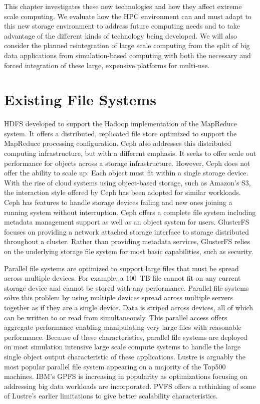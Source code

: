This chapter investigates these new technologies and how they affect extreme
scale computing. We evaluate how the HPC environment can and must adapt to this
new storage environment to address future computing needs and to take advantage
of the different kinds of technology being developed. We will also consider the
planned reintegration of large scale computing from the split of big data
applications from simulation-based computing with both the necessary and forced
integration of these large, expensive platforms for multi-use.

\section{Existing File Systems}

HDFS developed to support the Hadoop implementation of the MapReduce system. It
offers a distributed, replicated file store optimized to support the MapReduce
processing configuration. Ceph also addresses this distributed computing
infrastructure, but with a different emphasis. It seeks to offer scale out
performance for objects across a storage infrastructure. However, Ceph does not
offer the ability to scale up: Each object must fit within a single storage
device. With the rise of cloud systems using object-based storage, such as
Amazon's S3, the interaction style offered by Ceph has been adopted for similar
workloads. Ceph has features to handle storage devices failing and new ones
joining a running system without interruption. Ceph offers a complete file
system including metadata management support as well as an object system for
users. GlusterFS focuses on providing a network attached storage interface to
storage distributed throughout a cluster. Rather than providing metadata
services, GlusterFS relies on the underlying storage file system for most basic
capabilities, such as security.

Parallel file systems are optimized to support large files that must be spread
across multiple devices. For example, a 100~TB file cannot fit on any current
storage device and cannot be stored with any performance. Parallel file systems
solve this problem by using multiple devices spread across multiple servers
together as if they are a single device. Data is striped across devices, all of
which can be written to or read from simultaneously. This parallel access
offers aggregate performance enabling manipulating very large files with
reasonable performance. Because of these characteristics, parallel file systems
are deployed on most simulation intensive large scale compute systems to handle
the large single object output characteristic of these applications.  Lustre is
arguably the most popular parallel file system appearing on a majority of the
Top500 machines. IBM's GPFS is increasing in popularity as optimizations
focusing on addressing big data workloads are incorporated. PVFS offers a
rethinking of some of Lustre's earlier limitations to give better scalability
characteristics.

